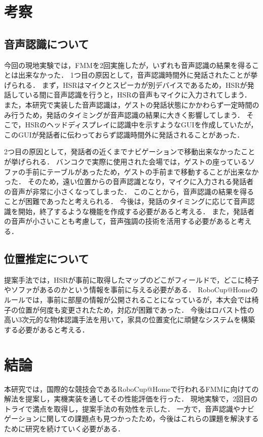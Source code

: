 \documentclass[a4j]{jarticle}
\begin{document}
\section{考察}

\subsection{音声認識について}
今回の現地実験では，FMMを2回実施したが，いずれも音声認識の結果を得ることは出来なかった．
1つ目の原因として，音声認識時間外に発話されたことが挙げられる．
まず，HSRはマイクとスピーカが別デバイスであるため，HSRが発話している間に音声認識を行うと，HSRの音声もマイクに入力されてしまう．
また，本研究で実装した音声認識は，ゲストの発話状態にかかわらず一定時間のみ行うため，発話のタイミングが音声認識の結果に大きく影響してしまう．
そこで，HSRのヘッドディスプレイに認識中を示すようなGUIを作成していたが，このGUIが発話者に伝わっておらず認識時間外に発話されることがあった．

2つ目の原因として，発話者の近くまでナビゲーションで移動出来なかったことが挙げられる．
バンコクで実際に使用された会場では，ゲストの座っているソファの手前にテーブルがあったため，ゲストの手前まで移動することが出来なかった．
そのため，遠い位置からの音声認識となり，マイクに入力される発話者の音声が非常に小さくなってしまった．
このことから，音声認識の結果を得ることが困難であったと考えられる．
今後は，発話のタイミングに応じて音声認識を開始，終了するような機能を作成する必要があると考える．
また，発話者の音声が小さいことも考慮して，音声強調\cite{voice_enhancement_1, voice_enhancement_2}の技術を活用する必要があると考える．

\subsection{位置推定について}
提案手法では，HSRが事前に取得したマップのどこがフィールドで，どこに椅子やソファがあるのかという情報を事前に与える必要がある．
RoboCup@Homeのルールでは，事前に部屋の情報が公開されることになっているが，本大会では椅子の位置が何度も変更されたため，対応が困難であった．
今後はロバスト性の高い3次元的な物体認識手法\cite{omni3d, sun2022onepose}を用いて，家具の位置変化に頑健なシステムを構築する必要があると考える．


\section{結論}
本研究では，国際的な競技会であるRoboCup@Homeで行われるFMMに向けての解法を提案し，実機実装を通してその性能評価を行った．
現地実験で，2回目のトライで満点を取得し，提案手法の有効性を示した．
一方で，音声認識やナビゲーションに関しての課題点も見つかったため，今後はこれらの課題を解決するために研究を続けていく必要がある．
\end{document}
